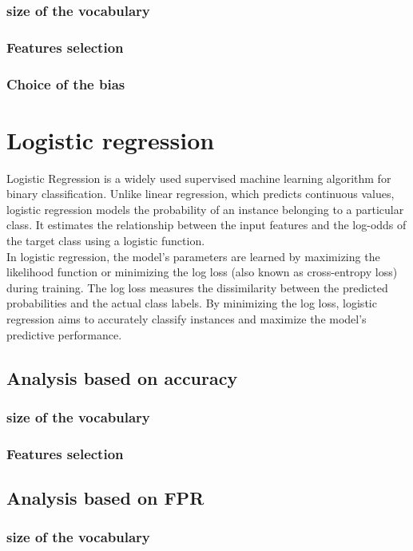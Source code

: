 \documentclass{class}
\begin{document}
\subsubsection*{size of the vocabulary}
\subsubsection*{Features selection}
\subsubsection*{Choice of the bias}
\section{Logistic regression}
Logistic Regression is a widely used supervised machine learning algorithm for binary classification.
Unlike linear regression, which predicts continuous values, logistic regression models the probability of an instance belonging to a particular class.
It estimates the relationship between the input features and the log-odds of the target class using a logistic function.\\
In logistic regression, the model's parameters are learned by maximizing the likelihood function or minimizing the log loss
(also known as cross-entropy loss) during training.
The log loss measures the dissimilarity between the predicted probabilities and the actual class labels.
By minimizing the log loss, logistic regression aims to accurately classify instances and maximize the model's predictive performance.
\subsection{Analysis based on accuracy}
\subsubsection*{size of the vocabulary}
\subsubsection*{Features selection}
\subsection{Analysis based on FPR}
\subsubsection*{size of the vocabulary}
\end{document}
